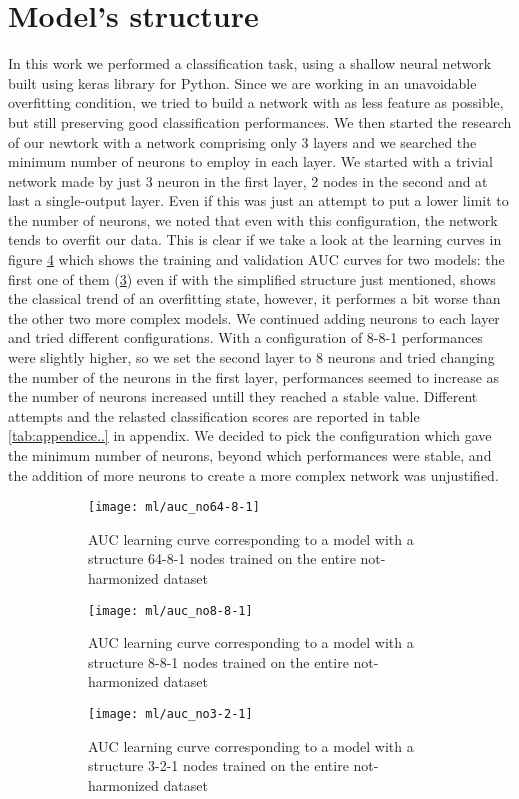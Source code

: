 \documentclass[11pt]{report}
\begin{document}
\section{Model's structure}
In this work we performed a classification task, using a shallow neural network built using keras library for Python.
Since we are working in an unavoidable overfitting condition, we tried to build a network with as less feature as possible, but still preserving good classification performances.
We then started the research of our newtork with a network comprising only 3 layers and we searched the minimum number of neurons to employ in each layer.
We started with a trivial network made by just 3 neuron in the first layer, 2 nodes in the second and at last a single-output layer. Even if this was just an attempt to put a lower limit to the number of neurons, we noted that even with this configuration, the network tends to overfit our data.
This is clear if we take a look at the learning curves in figure \ref{fig:learningcurve} which shows the training and validation AUC curves for two models: the first one of them (\ref{fig:auc_no3-2-1}) even if with the simplified structure just mentioned, shows the classical trend of an overfitting state, however, it performes a bit worse than the other two more complex models.
We continued adding neurons to each layer and tried different configurations. With a configuration of 8-8-1 performances were slightly higher, so we set the second layer to 8 neurons and tried changing the number of the neurons in the first layer, performances seemed to increase as the number of neurons increased untill they reached a stable value. Different attempts and the relasted classification scores are reported in table \ref{tab:appendice..} in appendix.
We decided to pick the configuration which gave the minimum number of neurons, beyond which performances were stable, and the addition of more neurons to create a more complex network was unjustified.

\begin{figure}
\centering
\begin{subfigure}[b]{0.3\textwidth}
   \texttt{[image: ml/auc\_no64-8-1]}
   \caption{AUC learning curve corresponding to a model with a structure 64-8-1 nodes trained on the entire not-harmonized dataset}
   \label{fig:auc_no64-8-1}
\end{subfigure}
\begin{subfigure}[b]{0.3\textwidth}
   \texttt{[image: ml/auc\_no8-8-1]}
   \caption{AUC learning curve corresponding to a model with a structure 8-8-1 nodes trained on the entire not-harmonized dataset}
   \label{fig:auc_no8-8-1}
\end{subfigure}
\begin{subfigure}[b]{0.3\textwidth}
   \texttt{[image: ml/auc\_no3-2-1]}
   \caption{AUC learning curve corresponding to a model with a structure 3-2-1 nodes trained on the entire not-harmonized dataset}
   \label{fig:auc_no3-2-1}
\end{subfigure}
\caption{}
\label{fig:learningcurve}
\end{figure}
\end{document}
